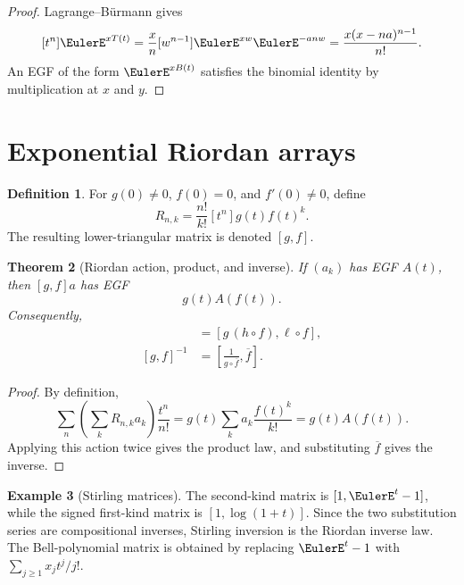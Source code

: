 \documentclass[11pt,a4paper,oneside,openany]{book}
\newtheorem{theorem}{Theorem}[chapter]
\theoremstyle{definition}
\newtheorem{definition}[theorem]{Definition}
\newtheorem{example}[theorem]{Example}
\theoremstyle{remark}
\begin{document}
\begin{proof}
Lagrange--Bürmann gives
\[
 [t^n]\EulerE^{xT(t)}=\frac{x}{n}[w^{n-1}]\EulerE^{xw}\EulerE^{-anw}
 =\frac{x(x-na)^{n-1}}{n!}.
\]
An EGF of the form $\EulerE^{xB(t)}$ satisfies the binomial identity by
multiplication at $x$ and $y$.
\end{proof}

\section{Exponential Riordan arrays}

\begin{definition}
For $g(0)\ne0$, $f(0)=0$, and $f'(0)\ne0$, define
\begin{equation}
 R_{n,k}=\frac{n!}{k!}[t^n]g(t)f(t)^k.                              \label{eq:merged-riordan-entry}
\end{equation}
The resulting lower-triangular matrix is denoted $[g,f]$.
\end{definition}

\begin{theorem}[Riordan action, product, and inverse]
\label{thm:merged-riordan}
If $(a_k)$ has EGF $A(t)$, then $[g,f]a$ has EGF
\begin{equation}
 g(t)A(f(t)).                                                        \label{eq:merged-riordan-action}
\end{equation}
Consequently,
\begin{align}
 [g,f][h,\ell]&=[g\,(h\circ f),\ell\circ f],                          \label{eq:merged-riordan-product}\\
 [g,f]^{-1}&=\left[\frac1{g\circ\overline f},\overline f\right].   \label{eq:merged-riordan-inverse}
\end{align}
\end{theorem}

\begin{proof}
By definition,
\[
 \sum_n\left(\sum_kR_{n,k}a_k\right)\frac{t^n}{n!}
 =g(t)\sum_k a_k\frac{f(t)^k}{k!}=g(t)A(f(t)).
\]
Applying this action twice gives the product law, and substituting
$\overline f$ gives the inverse.
\end{proof}

\begin{example}[Stirling matrices]
The second-kind matrix is $[1,\EulerE^t-1]$, while the signed first-kind matrix is
$[1,\log(1+t)]$.  Since the two substitution series are compositional
inverses, Stirling inversion is the Riordan inverse law.  The Bell-polynomial
matrix is obtained by replacing $\EulerE^t-1$ with
$\sum_{j\geq1}x_jt^j/j!$.
\end{example}
\end{document}
